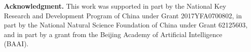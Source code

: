 \documentclass[10pt,twocolumn,letterpaper]{article}
\begin{document}

\noindent\textbf{Acknowledgment.}
This work was supported in part by the National Key Research and Development Program of China under Grant 2017YFA0700802, in part by the National Natural Science Foundation of China under Grant 62125603, and in part by a grant from the Beijing Academy of Artificial Intelligence (BAAI).


{\small


}
\end{document}
